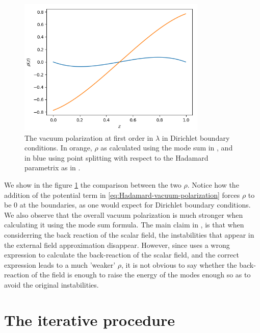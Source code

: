 \begin{figure}[t]
	\centering
	\includegraphics[width=0.8\textwidth]{figures/renormalization_comparison_rho.png}
	\caption{The vacuum polarization at first order in $\lambda$ in Dirichlet boundary conditions. In orange, $\rho$ as calculated using the mode sum in \cite{Ambjorn1983}, and in blue using point splitting with respect to the Hadamard parametrix as in \cite{Wernersson2020}. }
	\label{fig:perturbative-rho-comparison}
\end{figure}
We show in the figure \ref{fig:perturbative-rho-comparison} the comparison between the two $\rho$. Notice how the addition of the potential term in \eqref{eq:Hadamard-vacuum-polarization} forces $\rho$ to be 0 at the boundaries, as one would expect for Dirichlet boundary conditions. We also observe that the overall vacuum polarization is much stronger when calculating it using the mode sum formula. The main claim in  \cite{Ambjorn1983}, is that when considerring the back reaction of the scalar field, the instabilities that appear in the external field approximation disappear. However, since \cite{Ambjorn1983} uses a wrong expression to calculate the back-reaction of the scalar field, and the correct expression leads to a much 'weaker'  $\rho$, it is not obvious to say whether the back-reaction of the field is enough to raise the energy of the modes enough so as to avoid the original instabilities.
\section{The iterative procedure}

